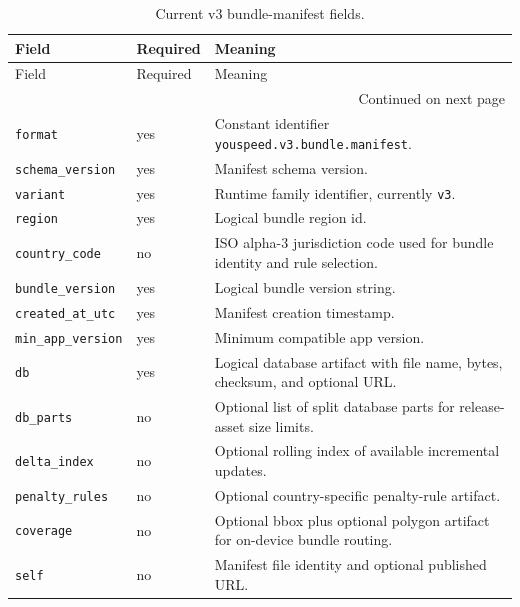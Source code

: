 \documentclass{article}
\begin{document}
{\scriptsize
\begin{longtable}{@{}p{3.5cm}p{1.1cm}p{6.6cm}@{}}
\caption{Current v3 bundle-manifest fields.}
\label{tab:contract_bundle_manifest}\\
\toprule
Field & Required & Meaning \\
\midrule
\endfirsthead
\toprule
Field & Required & Meaning \\
\midrule
\endhead
\midrule
\multicolumn{3}{r}{Continued on next page} \\
\midrule
\endfoot
\bottomrule
\endlastfoot
\nolinkurl{format} & yes & Constant identifier \nolinkurl{youspeed.v3.bundle.manifest}. \\
\nolinkurl{schema_version} & yes & Manifest schema version. \\
\nolinkurl{variant} & yes & Runtime family identifier, currently \nolinkurl{v3}. \\
\nolinkurl{region} & yes & Logical bundle region id. \\
\nolinkurl{country_code} & no & ISO alpha-3 jurisdiction code used for bundle identity and rule selection. \\
\nolinkurl{bundle_version} & yes & Logical bundle version string. \\
\nolinkurl{created_at_utc} & yes & Manifest creation timestamp. \\
\nolinkurl{min_app_version} & yes & Minimum compatible app version. \\
\nolinkurl{db} & yes & Logical database artifact with file name, bytes, checksum, and optional URL. \\
\nolinkurl{db_parts} & no & Optional list of split database parts for release-asset size limits. \\
\nolinkurl{delta_index} & no & Optional rolling index of available incremental updates. \\
\nolinkurl{penalty_rules} & no & Optional country-specific penalty-rule artifact. \\
\nolinkurl{coverage} & no & Optional bbox plus optional polygon artifact for on-device bundle routing. \\
\nolinkurl{self} & no & Manifest file identity and optional published URL. \\
\end{longtable}
}
\end{document}
